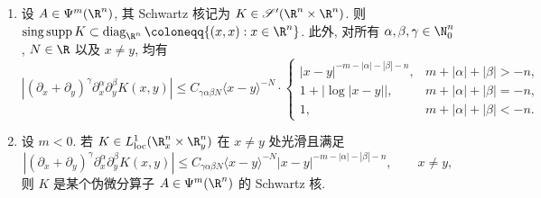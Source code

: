 \begin{corollary}\label{cor:4.9}
\begin{enumerate}
    \item 设 $A \in \Psi^m(\R^n)$, 其 Schwartz 核记为 $K \in \TempDistr(\R^n \times \R^n)$. 则 $\singsupp K \subset \operatorname{diag}_{\R^n} \defeq \{(x, x) : x \in \R^n\}$. 此外, 对所有 $\alpha, \beta, \gamma \in \N_0^n$, $N \in \R$ 以及 $x \neq y$, 均有
    \begin{equation}\label{eq:4.41}
        \left| (\partial_x + \partial_y)^\gamma \partial_x^\alpha \partial_y^\beta K(x, y) \right| \le C_{\gamma\alpha\beta N} \langle x - y \rangle^{-N} \cdot \begin{cases}
            |x - y|^{-m - |\alpha| - |\beta| - n}, & m + |\alpha| + |\beta| > -n, \\
            1 + |\log |x - y||, & m + |\alpha| + |\beta| = -n, \\
            1, & m + |\alpha| + |\beta| < -n.
        \end{cases}
    \end{equation}
    \item 设 $m < 0$. 若 $K \in L^1_{\mathrm{loc}}(\R_x^n \times \R_y^n)$ 在 $x \neq y$ 处光滑且满足
    \begin{equation}\label{eq:4.42}
        \left| (\partial_x + \partial_y)^\gamma \partial_x^\alpha \partial_y^\beta K(x, y) \right| \le C_{\gamma\alpha\beta N} \langle x - y \rangle^{-N} |x - y|^{-m - |\alpha| - |\beta| - n}, \qquad x \neq y,
    \end{equation}
    则 $K$ 是某个伪微分算子 $A \in \Psi^m(\R^n)$ 的 Schwartz 核.
\end{enumerate}
\end{corollary}

